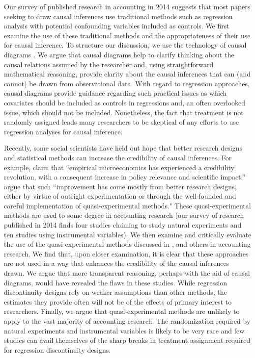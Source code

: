 \documentclass[11pt]{amsart}
\begin{document}
Our survey of published research in accounting in 2014 suggests that most papers seeking to draw causal inferences use traditional methods such as regression analysis with potential confounding variables included as controls.
We first examine the use of these traditional methods and the appropriateness of their use for causal inference.
To structure our discussion, we use the technology of causal diagrams \citep{Pearl:2009kh}.
We argue that causal diagrams help to clarify thinking about the causal relations assumed by the researcher and, using straightforward mathematical reasoning, provide clarity about the causal inferences that can (and cannot) be drawn from observational data.
With regard to regression approaches, causal diagrams provide guidance regarding such practical issues as which covariates should be included as controls in regressions and, an often overlooked issue, which should not be included.
Nonetheless, the fact that treatment is not randomly assigned leads many researchers to be skeptical of any efforts to use regression analyses for causal inference.

Recently, some social scientists have held out hope that better research designs and statistical methods can increase the credibility of causal inferences.
For example, \citet{Angrist:2010jv} claim that ``empirical microeconomics has experienced a credibility revolution, with a consequent increase in policy relevance and scientific impact.''  
\citet[p. 26]{Angrist:2010jv} argue that such ``improvement has come mostly from better research designs, either by virtue of outright experimentation or through the well-founded and careful implementation of quasi-experimental methods."
These quasi-experimental methods are used to some degree in accounting research (our survey of research published in 2014 finds four studies claiming to study natural experiments and ten studies using instrumental variables).
We then examine and critically evaluate the use of the quasi-experimental methods discussed in \citet{Angrist:2010jv}, \citet{Roberts:2013cz} and others in accounting research.
We find that, upon closer examination, it is clear that these approaches are not used in a way that enhances the credibility of the causal inferences drawn.
We argue that more transparent reasoning, perhaps with the aid of causal diagrams, would have revealed the flaws in these studies.
While regression discontinuity designs rely on weaker assumptions than other methods, the estimates they provide often will not be of the effects of primary interest to researchers.
Finally, we argue that quasi-experimental methods are unlikely to apply to the vast majority of accounting research.
The randomization required by natural experiments and instrumental variables is likely to be very rare and few studies can avail themselves of the sharp breaks in treatment assignment required for regression discontinuity designs.
\end{document}
